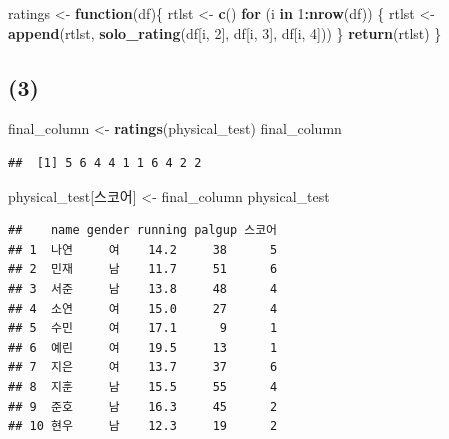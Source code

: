 \documentclass[
]{article}
\newenvironment{Shaded}{\begin{snugshade}}{\end{snugshade}}
\newcommand{\ControlFlowTok}[1]{\textcolor[rgb]{0.13,0.29,0.53}{\textbf{#1}}}
\newcommand{\DecValTok}[1]{\textcolor[rgb]{0.00,0.00,0.81}{#1}}
\newcommand{\FunctionTok}[1]{\textcolor[rgb]{0.13,0.29,0.53}{\textbf{#1}}}
\newcommand{\NormalTok}[1]{#1}
\newcommand{\OtherTok}[1]{\textcolor[rgb]{0.56,0.35,0.01}{#1}}
\newcommand{\SpecialCharTok}[1]{\textcolor[rgb]{0.81,0.36,0.00}{\textbf{#1}}}
\newcommand{\StringTok}[1]{\textcolor[rgb]{0.31,0.60,0.02}{#1}}
\begin{document}
\begin{Shaded}
\begin{Highlighting}[]
\NormalTok{ratings }\OtherTok{\textless{}{-}} \ControlFlowTok{function}\NormalTok{(df)\{}
\NormalTok{  rtlst }\OtherTok{\textless{}{-}} \FunctionTok{c}\NormalTok{()}
  \ControlFlowTok{for}\NormalTok{ (i }\ControlFlowTok{in} \DecValTok{1}\SpecialCharTok{:}\FunctionTok{nrow}\NormalTok{(df)) \{}
\NormalTok{    rtlst }\OtherTok{\textless{}{-}} \FunctionTok{append}\NormalTok{(rtlst, }\FunctionTok{solo\_rating}\NormalTok{(df[i, }\DecValTok{2}\NormalTok{], df[i, }\DecValTok{3}\NormalTok{], df[i, }\DecValTok{4}\NormalTok{]))}
\NormalTok{  \}}
  \FunctionTok{return}\NormalTok{(rtlst)}
\NormalTok{\}}
\end{Highlighting}
\end{Shaded}

\subsection{(3)}\label{section-4}

\begin{Shaded}
\begin{Highlighting}[]
\NormalTok{final\_column }\OtherTok{\textless{}{-}} \FunctionTok{ratings}\NormalTok{(physical\_test)}
\NormalTok{final\_column}
\end{Highlighting}
\end{Shaded}

\begin{verbatim}
##  [1] 5 6 4 4 1 1 6 4 2 2
\end{verbatim}

\begin{Shaded}
\begin{Highlighting}[]
\NormalTok{physical\_test[}\StringTok{\textquotesingle{}스코어\textquotesingle{}}\NormalTok{] }\OtherTok{\textless{}{-}}\NormalTok{ final\_column}
\NormalTok{physical\_test}
\end{Highlighting}
\end{Shaded}

\begin{verbatim}
##    name gender running palgup 스코어
## 1  나연     여    14.2     38      5
## 2  민재     남    11.7     51      6
## 3  서준     남    13.8     48      4
## 4  소연     여    15.0     27      4
## 5  수민     여    17.1      9      1
## 6  예린     여    19.5     13      1
## 7  지은     여    13.7     37      6
## 8  지훈     남    15.5     55      4
## 9  준호     남    16.3     45      2
## 10 현우     남    12.3     19      2
\end{verbatim}
\end{document}
